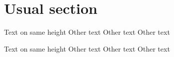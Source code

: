 \documentclass{kapital}
\begin{document}
  \tableofcontents*
  \mainmatter

  \section{Usual section}

  Text on same height
  \clearpage
  Other text
    \clearpage
  Other text
    \clearpage
  Other text


  Text on same height
  \clearpage
  Other text
    \clearpage
  Other text
    \clearpage
  Other text








\end{document}
